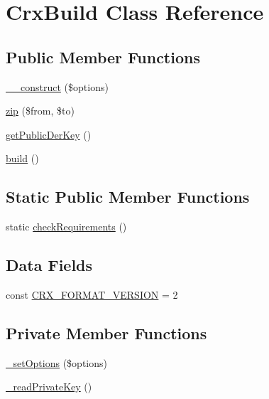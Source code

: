 \hypertarget{class_crx_build}{}\section{Crx\+Build Class Reference}
\label{class_crx_build}
\subsection*{Public Member Functions}
\begin{DoxyCompactItemize}
\item 
\hyperlink{class_crx_build_ae8b8e1144b807ac13f20a916fd073b32}{\+\_\+\+\_\+construct} (\$options)
\item 
\hyperlink{class_crx_build_aa41f94717e5e2ca6f60bfda8ef61a331}{zip} (\$from, \$to)
\item 
\hyperlink{class_crx_build_aa601c5e69abfbc67106f5bde0f1ca81a}{get\+Public\+Der\+Key} ()
\item 
\hyperlink{class_crx_build_a3928875ef0ceb18a51c1061be3eb3a00}{build} ()
\end{DoxyCompactItemize}
\subsection*{Static Public Member Functions}
\begin{DoxyCompactItemize}
\item 
static \hyperlink{class_crx_build_abc40524a7532c15e64d949e89cbd5c1a}{check\+Requirements} ()
\end{DoxyCompactItemize}
\subsection*{Data Fields}
\begin{DoxyCompactItemize}
\item 
const \hyperlink{class_crx_build_aad73019f97319636632f3428710e0221}{C\+R\+X\+\_\+\+F\+O\+R\+M\+A\+T\+\_\+\+V\+E\+R\+S\+I\+O\+N} = 2
\end{DoxyCompactItemize}
\subsection*{Private Member Functions}
\begin{DoxyCompactItemize}
\item 
\hyperlink{class_crx_build_a61c856a8dcb16fb23e8bba19364f748c}{\+\_\+set\+Options} (\$options)
\item 
\hyperlink{class_crx_build_a67bc545916848f8b958a9c030edf79fa}{\+\_\+read\+Private\+Key} ()
\end{DoxyCompactItemize}
